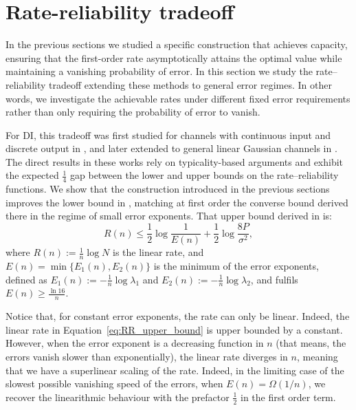 \documentclass[10pt,conference]{IEEEtran}
\newcommand{\1}{\mathds{1}}
\begin{document}






\section{Rate-reliability tradeoff}\label{sec:RR_tradeoff}
In the previous sections we studied a specific construction that achieves capacity, ensuring that the first-order rate asymptotically attains the optimal value while maintaining a vanishing probability of error. In this section we study the rate–reliability tradeoff extending these methods to general error regimes. In other words, we investigate the achievable rates under different fixed error requirements rather than only requiring the probability of error to vanish.

For DI, this tradeoff was first studied for channels with continuous input and discrete output in \cite{CDBW:Reliability-TCOM,DI-steins}, and later extended to general linear Gaussian channels in \cite{RRGauss-arXiv}. The direct results in these works rely on typicality-based arguments and exhibit the expected $\frac{1}{4}$ gap between the lower and upper bounds on the rate–reliability functions.
We show that the construction introduced in the previous sections improves the lower bound in \cite{RRGauss-arXiv}, matching at first order the converse bound derived there in the regime of small error exponents. That upper bound derived in \cite{RRGauss-arXiv} is:
\begin{equation}\label{eq:RR_upper_bound}
R(n)\leq\frac12\log\frac{1}{E(n)}+\frac12\log\frac{8P}{\sigma^2},
\end{equation}
where $R(n):=\frac1n \log N$ is the linear rate, and $E(n)=\min\{E_1(n),E_2(n)\}$ is the minimum of the error exponents, defined as $E_1(n):=-\frac1n\log\lambda_1$ and $E_2(n):=-\frac1n\log\lambda_2$, and fulfils $E(n)\geq\frac{\ln16}{n}$.

Notice that, for constant error exponents, the rate can only be linear. Indeed, the linear rate in Equation~\eqref{eq:RR_upper_bound} is upper bounded by a constant. However, when the error exponent is a decreasing function in $n$ (that means, the errors vanish slower than exponentially), the linear rate diverges in $n$, meaning that we have a superlinear scaling of the rate. Indeed, in the limiting case of the slowest possible vanishing speed of the errors, when $E(n)=\Omega(1/n)$, we recover the linearithmic behaviour with the prefactor $\frac12$ in the first order term.
\end{document}
